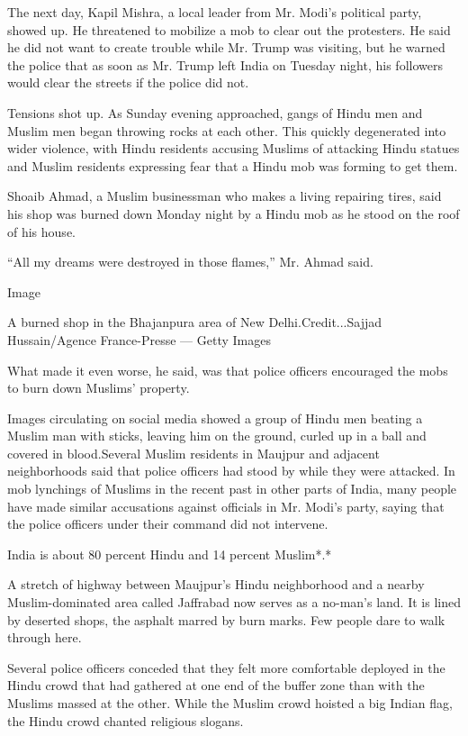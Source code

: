 The next day, Kapil Mishra, a local leader from Mr. Modi's political
party, showed up. He threatened to mobilize a mob to clear out the
protesters. He said he did not want to create trouble while Mr. Trump
was visiting, but he warned the police that as soon as Mr. Trump left
India on Tuesday night, his followers would clear the streets if the
police did not.

Tensions shot up. As Sunday evening approached, gangs of Hindu men and
Muslim men began throwing rocks at each other. This quickly degenerated
into wider violence, with Hindu residents accusing Muslims of attacking
Hindu statues and Muslim residents expressing fear that a Hindu mob was
forming to get them.

Shoaib Ahmad, a Muslim businessman who makes a living repairing tires,
said his shop was burned down Monday night by a Hindu mob as he stood on
the roof of his house.

``All my dreams were destroyed in those flames,'' Mr. Ahmad said.

Image

A burned shop in the Bhajanpura area of New Delhi.Credit...Sajjad
Hussain/Agence France-Presse --- Getty Images

What made it even worse, he said, was that police officers encouraged
the mobs to burn down Muslims' property.

Images circulating on social media showed a group of Hindu men beating a
Muslim man with sticks, leaving him on the ground, curled up in a ball
and covered in blood.Several Muslim residents in Maujpur and adjacent
neighborhoods said that police officers had stood by while they were
attacked. In mob lynchings of Muslims in the recent past in other parts
of India, many people have made similar accusations against officials in
Mr. Modi's party, saying that the police officers under their command
did not intervene.

India is about 80 percent Hindu and 14 percent Muslim*.*

A stretch of highway between Maujpur's Hindu neighborhood and a nearby
Muslim-dominated area called Jaffrabad now serves as a no-man's land. It
is lined by deserted shops, the asphalt marred by burn marks. Few people
dare to walk through here.

Several police officers conceded that they felt more comfortable
deployed in the Hindu crowd that had gathered at one end of the buffer
zone than with the Muslims massed at the other. While the Muslim crowd
hoisted a big Indian flag, the Hindu crowd chanted religious slogans.

